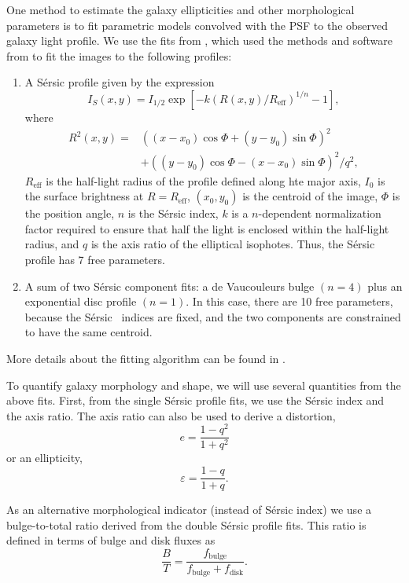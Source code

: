 \documentclass[twocolumn,useAMS,usenatbib]{mn2e}
\newcommand{\sersic}{S\'{e}rsic }
\begin{document}
One method to estimate the galaxy ellipticities and other
morphological parameters is to fit parametric models convolved with
the PSF to the observed galaxy light profile.  We use the fits from
\cite{great3}, which used the methods and
software from \cite{Claire_Fits} to fit the images to the following profiles:
\begin{enumerate}
 \item A \sersic profile given by the expression 
       \begin{equation} 
    I_S(x,y) = I_{1/2}\exp{\left[ -k(R(x,y)/R_{\text{eff}})^{1/n} -1 \right]},
       \end{equation}
where \begin{align*} R^2(x,y) = & ((x-x_0)\cos\Phi+(y-y_0)\sin\Phi)^2
  \\ & + ((y-y_0)\cos\Phi-(x-x_0)\sin\Phi)^2/q^2, \end{align*}
$R_{\text{eff}}$ is the half-light radius of the profile defined along
hte major axis, $I_0$ is the surface brightness at $R=R_{\text{eff}}$, $(x_0,y_0)$ is the centroid of the image,
$\Phi$ is the position angle, $n$ is the \sersic index, $k$ is a
$n$-dependent normalization factor required to ensure that half the
light is enclosed within the half-light radius, and $q$ is the axis
ratio of the elliptical isophotes.
Thus, the \sersic profile has 7 free parameters.
       \item A sum of two \sersic component fits: a de Vaucouleurs
         bulge $(n=4)$ plus an exponential disc profile $(n=1)$.  In this
         case, there are 10 free parameters, because the \sersic\
         indices are fixed, and the two components are constrained to
         have the same centroid.
\end{enumerate}
More details about the fitting algorithm can be found
in \cite{Claire_Fits}.

To quantify galaxy morphology and shape, we will use several
quantities from the above fits.  First, from the single \sersic
profile fits, we use the \sersic index and the axis ratio.  The axis
ratio can also be used to derive a distortion,
\begin{equation}\label{eq:distortion}
e = \frac{1-q^2}{1+q^2}
\end{equation}
or an ellipticity,
\begin{equation}\label{eq:ellipticity}
\varepsilon = \frac{1-q}{1+q}.
\end{equation}

As an alternative morphological indicator (instead of \sersic index)
we use a bulge-to-total ratio derived from the double \sersic
profile fits.  This ratio is defined in terms of bulge and disk fluxes as
\begin{equation}
\frac{B}{T} = \frac{f_\text{bulge}}{f_\text{bulge}+f_\text{disk}}.
\end{equation}
 
\end{document}
